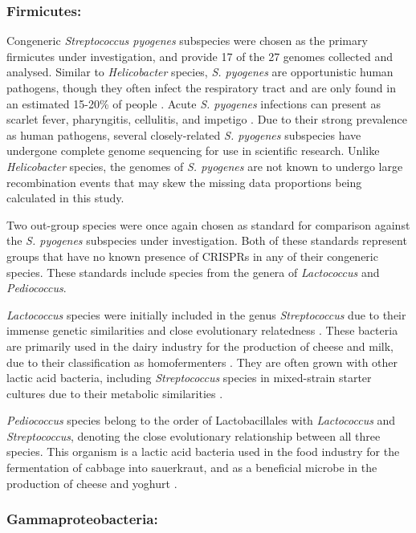 \documentclass[english]{article}
\begin{document}
\subsubsection{Firmicutes:}
Congeneric \textit{Streptococcus pyogenes} subspecies were
chosen as the primary firmicutes under investigation, and provide
17 of the 27 genomes collected and analysed. Similar to
\textit{Helicobacter} species, \textit{S. pyogenes}
are opportunistic human pathogens, though they often infect the respiratory
tract and are only found in an estimated 15-20\% of people
\citep{Todar:08}. Acute
\textit{S. pyogenes} infections can present as scarlet fever,
pharyngitis, cellulitis, and impetigo \citep{Todar:08}. Due to their strong prevalence
as human pathogens, several closely-related \textit{S. pyogenes}
subspecies have undergone complete genome sequencing for use in
scientific research. Unlike \textit{Helicobacter} species, the genomes
of \textit{S. pyogenes} are not known to undergo large recombination events
that may skew the missing data proportions being calculated in this
study. 

Two out-group species were once again chosen as standard for
comparison against the \textit{S. pyogenes} subspecies under
investigation. Both of these standards represent groups that have no
known presence of CRISPRs in any of their congeneric species. These
standards include species from the genera of \textit{Lactococcus} and
\textit{Pediococcus}.

\textit{Lactococcus} species were initially included in the genus
\textit{Streptococcus } due to their immense genetic similarities and
close evolutionary relatedness \citep{Schl:85}. These bacteria are primarily used in
the dairy industry for the production of cheese and milk, due to their
classification as homofermenters \citep{Cogan:97}. They are often grown with other lactic
acid bacteria, including \textit{Streptococcus} species in
mixed-strain starter cultures due to their metabolic similarities
\citep{Cogan:97}. 

\textit{Pediococcus} species belong to the order of Lactobacillales
with \textit{Lactococcus} and \textit{Streptococcus}, denoting the
close evolutionary relationship between all three species. This
organism is a lactic acid bacteria used in the food industry for the
fermentation of cabbage into sauerkraut, and as a beneficial microbe in
the production of cheese and yoghurt \citep{Flemi:85}.  

\subsubsection{Gammaproteobacteria:}
\end{document}
